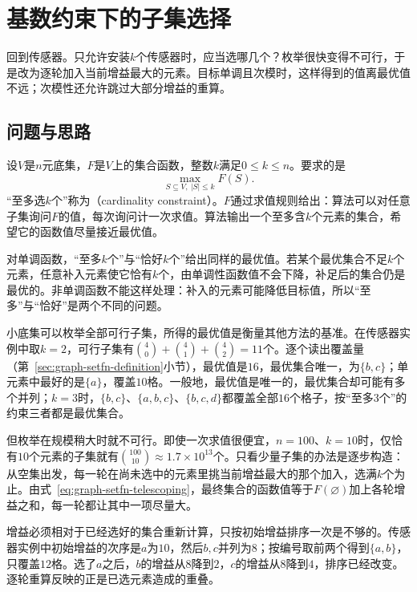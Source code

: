
\section{基数约束下的子集选择}
\label{sec:graph-cardinality-selection}

回到传感器。只允许安装$k$个传感器时，应当选哪几个？枚举很快变得不可行，于是改为逐轮加入当前增益最大的元素。目标单调且次模时，这样得到的值离最优值不远；次模性还允许跳过大部分增益的重算。

\subsection{问题与思路}
\label{sec:graph-setfn-cardinality-problem}

设$V$是$n$元底集，$F$是$V$上的集合函数，整数$k$满足$0\leq k\leq n$。要求的是
\begin{equation}
  \max_{S\subseteq V,\ |S|\leq k}F(S).
  \label{eq:graph-setfn-cardinality-problem}
\end{equation}
“至多选$k$个”称为（cardinality constraint）。$F$通过求值规则给出：算法可以对任意子集询问$F$的值，每次询问计一次求值。算法输出一个至多含$k$个元素的集合，希望它的函数值尽量接近最优值。

对单调函数，“至多$k$个”与“恰好$k$个”给出同样的最优值。若某个最优集合不足$k$个元素，任意补入元素使它恰有$k$个，由单调性函数值不会下降，补足后的集合仍是最优的。非单调函数不能这样处理：补入的元素可能降低目标值，所以“至多”与“恰好”是两个不同的问题。

小底集可以枚举全部可行子集，所得的最优值是衡量其他方法的基准。在传感器实例中取$k=2$，可行子集有$\binom40+\binom41+\binom42=11$个。逐个读出覆盖量（第~\ref{sec:graph-setfn-definition}小节），最优值是$16$，最优集合唯一，为$\{b,c\}$；单元素中最好的是$\{a\}$，覆盖$10$格。一般地，最优值是唯一的，最优集合却可能有多个并列；$k=3$时，$\{b,c\}$、$\{a,b,c\}$、$\{b,c,d\}$都覆盖全部$16$个格子，按“至多$3$个”的约束三者都是最优集合。

但枚举在规模稍大时就不可行。即使一次求值很便宜，$n=100$、$k=10$时，仅恰有$10$个元素的子集就有$\binom{100}{10}\approx1.7\times10^{13}$个。只看少量子集的办法是逐步构造：从空集出发，每一轮在尚未选中的元素里挑当前增益最大的那个加入，选满$k$个为止。由式~\eqref{eq:graph-setfn-telescoping}，最终集合的函数值等于$F(\varnothing)$加上各轮增益之和，每一轮都让其中一项尽量大。

增益必须相对于已经选好的集合重新计算，只按初始增益排序一次是不够的。传感器实例中初始增益的次序是$a$为$10$，然后$b,c$并列为$8$；按编号取前两个得到$\{a,b\}$，只覆盖$12$格。选了$a$之后，$b$的增益从$8$降到$2$，$c$的增益从$8$降到$4$，排序已经改变。逐轮重算反映的正是已选元素造成的重叠。


